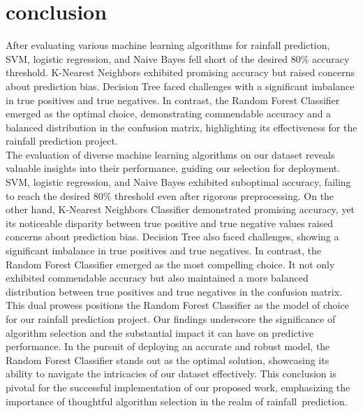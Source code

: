 \documentclass[conference, onecolumn]{IEEEtran}
\begin{document}
\section{\textbf{conclusion}}
After evaluating various machine learning algorithms for rainfall prediction, SVM, logistic regression, and Naive Bayes fell short of the desired 80\% accuracy threshold. K-Nearest Neighbors exhibited promising accuracy but raised concerns about prediction bias. Decision Tree faced challenges with a significant imbalance in true positives and true negatives. In contrast, the Random Forest Classifier emerged as the optimal choice, demonstrating commendable accuracy and a balanced distribution in the confusion matrix, highlighting its effectiveness for the rainfall prediction project.
\\ \indent The evaluation of diverse machine learning algorithms on our dataset reveals valuable insights into their performance, guiding our selection for deployment. SVM, logistic regression, and Naive Bayes exhibited suboptimal accuracy, failing to reach the desired 80\% threshold even after rigorous preprocessing. On the other hand, K-Nearest Neighbors Classifier demonstrated promising accuracy, yet its noticeable disparity between true positive and true negative values raised concerns about prediction bias. Decision Tree also faced challenges, showing a significant imbalance in true positives and true negatives. In contrast, the Random Forest Classifier emerged as the most compelling choice. It not only exhibited commendable accuracy but also maintained a more balanced distribution between true positives and true negatives in the confusion matrix. This dual prowess positions the Random Forest Classifier as the model of choice for our rainfall prediction project. Our findings underscore the significance of algorithm selection and the substantial impact it can have on predictive performance. In the pursuit of deploying an accurate and robust model, the Random Forest Classifier stands out as the optimal solution, showcasing its ability to navigate the intricacies of our dataset effectively. This conclusion is pivotal for the successful implementation of our proposed work, emphasizing the importance of thoughtful algorithm selection in the realm of rainfall prediction.
\end{document}
